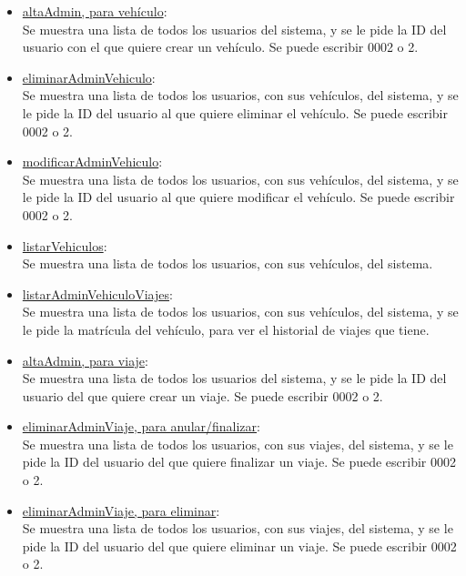 \begin{itemize}
  \item \href{DOC_DOXYGEN/escribir_8c_source.html}{altaAdmin, para vehículo}:\\
  Se muestra una lista de todos los usuarios del sistema, y se le pide la ID del usuario con el que quiere crear un vehículo. Se puede escribir 0002 o 2.

  \item \href{DOC_DOXYGEN/eliminar_8c_source.html}{eliminarAdminVehiculo}:\\
  Se muestra una lista de todos los usuarios, con sus vehículos, del sistema, y se le pide la ID del usuario al que quiere eliminar el vehículo. Se puede escribir 0002 o 2.

  \item \href{DOC_DOXYGEN/modificar_8c_source.html}{modificarAdminVehiculo}:\\
  Se muestra una lista de todos los usuarios, con sus vehículos, del sistema, y se le pide la ID del usuario al que quiere modificar el vehículo. Se puede escribir 0002 o 2.

  \item \href{DOC_DOXYGEN/listar_8c_source.html}{listarVehiculos}:\\
  Se muestra una lista de todos los usuarios, con sus vehículos, del sistema.

  \item \href{DOC_DOXYGEN/listar_8c_source.html}{listarAdminVehiculoViajes}:\\
  Se muestra una lista de todos los usuarios, con sus vehículos, del sistema, y se le pide la matrícula del vehículo, para ver el historial de viajes que tiene.

  \item \href{DOC_DOXYGEN/escribir_8c_source.html}{altaAdmin, para viaje}:\\
  Se muestra una lista de todos los usuarios del sistema, y se le pide la ID del usuario del que quiere crear un viaje. Se puede escribir 0002 o 2.

  \item \href{DOC_DOXYGEN/eliminar_8c_source.html}{eliminarAdminViaje, para anular/finalizar}:\\
  Se muestra una lista de todos los usuarios, con sus viajes, del sistema, y se le pide la ID del usuario del que quiere finalizar un viaje. Se puede escribir 0002 o 2.

  \item \href{DOC_DOXYGEN/eliminar_8c_source.html}{eliminarAdminViaje, para eliminar}:\\
  Se muestra una lista de todos los usuarios, con sus viajes, del sistema, y se le pide la ID del usuario del que quiere eliminar un viaje. Se puede escribir 0002 o 2.


\end{itemize}
